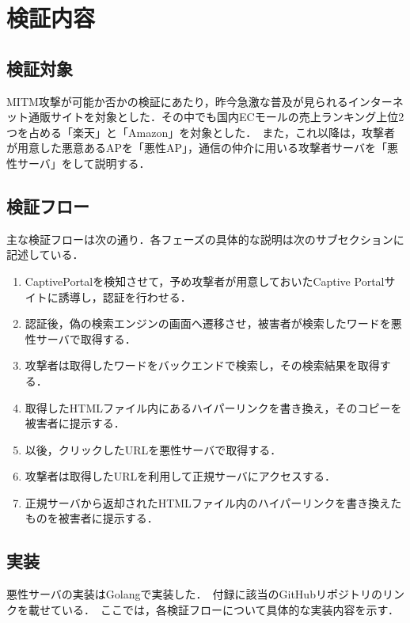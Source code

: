 \documentclass[dvipdfmx]{jsarticle}
\begin{document}
    \section{検証内容}
        \subsection{検証対象}
            MITM攻撃が可能か否かの検証にあたり，昨今急激な普及が見られるインターネット通販サイトを対象とした．その中でも国内ECモールの売上ランキング上位2つを占める「楽天」と「Amazon」を対象とした．\
            また，これ以降は，攻撃者が用意した悪意あるAPを「悪性AP」，通信の仲介に用いる攻撃者サーバを「悪性サーバ」をして説明する．
        \subsection{検証フロー}
            主な検証フローは次の通り．各フェーズの具体的な説明は次のサブセクションに記述している．
            \begin{enumerate}
                \item CaptivePortalを検知させて，予め攻撃者が用意しておいたCaptive Portalサイトに誘導し，認証を行わせる．
                \item 認証後，偽の検索エンジンの画面へ遷移させ，被害者が検索したワードを悪性サーバで取得する．
                \item 攻撃者は取得したワードをバックエンドで検索し，その検索結果を取得する．
                \item 取得したHTMLファイル内にあるハイパーリンクを書き換え，そのコピーを被害者に提示する．
                \item 以後，クリックしたURLを悪性サーバで取得する．
                \item 攻撃者は取得したURLを利用して正規サーバにアクセスする．
                \item 正規サーバから返却されたHTMLファイル内のハイパーリンクを書き換えたものを被害者に提示する．
            \end{enumerate}
        \subsection{実装}
            悪性サーバの実装はGolangで実装した．\
            付録に該当のGitHubリポジトリのリンクを載せている．\
            ここでは，各検証フローについて具体的な実装内容を示す．\
\end{document}
